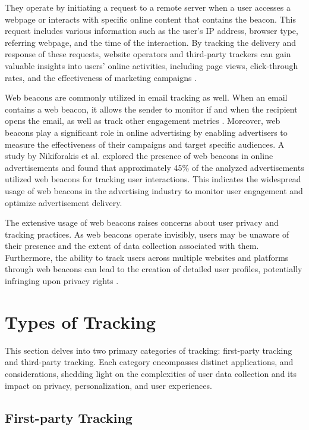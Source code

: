 They operate by initiating a request to a remote server when a user accesses a webpage
or interacts with specific online content that contains the beacon. This request includes various
information such as the user's IP address, browser type, referring webpage, and the time of
the interaction. By tracking the delivery and response of these requests, website operators
and third-party trackers can gain valuable insights into users' online activities,
including page views, click-through rates, and the effectiveness of marketing campaigns \cite{zimmer2010but}.

Web beacons are commonly utilized in email tracking as well. When an email contains a web beacon, it allows the sender to monitor
if and when the recipient opens the email, as well as track other engagement metrics \cite{gurses2011engineering}. 
Moreover, web beacons play a significant role in online advertising by enabling advertisers to measure the effectiveness
of their campaigns and target specific audiences. A study by Nikiforakis et al. \cite{nikiforakis2013cookieless}
explored the presence of web beacons in online advertisements and found that approximately 45\% of the analyzed advertisements
utilized web beacons for tracking user interactions. This indicates the widespread usage of web beacons in the advertising
industry to monitor user engagement and optimize advertisement delivery.

The extensive usage of web beacons raises concerns about user privacy and tracking practices. As web beacons operate invisibly,
users may be unaware of their presence and the extent of data collection associated with them. Furthermore, the ability to track
users across multiple websites and platforms through web beacons can lead to the creation of detailed user profiles,
potentially infringing upon privacy rights \cite{acquisti2015privacy}.

\section{Types of Tracking}
This section delves into two primary categories of tracking: first-party tracking and third-party tracking.
Each category encompasses distinct applications, and considerations, shedding light on the complexities
of user data collection and its impact on privacy, personalization, and user experiences.
\subsection{First-party Tracking}

